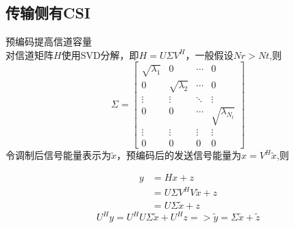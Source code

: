 \subsection{传输侧有CSI}
预编码提高信道容量 \\
对信道矩阵$H$使用SVD分解，即$H=U\Sigma V^H$，一般假设$Nr>Nt$,则
\begin{equation}
\Sigma=\left[ 
    \begin{matrix}
        \sqrt{\lambda_1} & 0 & \cdots & 0 \\
        0 & \sqrt{\lambda_2} & \cdots & 0 \\
        \vdots & \vdots & \ddots & \vdots \\
        0 & 0 & \cdots & \sqrt{\lambda_{N_t}} \\
        \vdots & \vdots & \vdots & \vdots \\
        0 & 0 & 0 & 0
    \end{matrix}
\right] 
\end{equation}
令调制后信号能量表示为$\tilde{x}$，预编码后的发送信号能量为$x=V^H\tilde{x}$,则

\begin{equation}
    \begin{aligned}
    y &= Hx+z \\
    &=U\Sigma V^HV\tilde{x}+z \\ 
    &=U\Sigma\tilde{x}+z
    \end{aligned}
\end{equation}  
\begin{equation}
    U^Hy = U^HU\Sigma\tilde{x}+U^Hz =>
    \tilde{y}=\Sigma\tilde{x}+\tilde{z}
\end{equation} 


